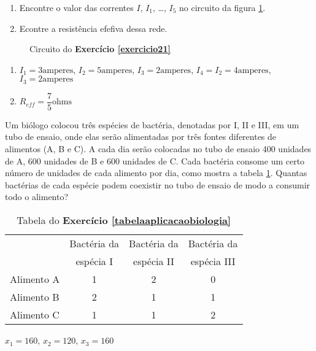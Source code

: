 \documentclass[12pt]{exam}
\begin{document}
\begin{exercicio}\label{exercicio21}
  \begin{enumerate}[label={\alph*})]
    \item Encontre o valor das correntes $I$, $I_1$, \dots, $I_5$ no circuito da figura \ref{exercicio21circuitopoole}.
    \item Econtre a resistência efefiva dessa rede.
  \end{enumerate}
  \begin{figure}
    \centering
    
    \caption{Circuito do \textbf{Exercício \ref{exercicio21}}}
    \label{exercicio21circuitopoole}
  \end{figure}
  \begin{solucao}
    \begin{enumerate}[label={\alph*})]
      \item $I_1 = 3 \mbox{amperes}$, $I_2 = 5 \mbox{amperes}$, $I_3 = 2 \mbox{amperes}$, $I_4 = I_2 =  4\mbox{amperes}$, $I_3 = 2 \mbox{amperes}$
      \item $R_{eff} = \dfrac{7}{5} \mbox{ohms}$
    \end{enumerate}
  \end{solucao}
\end{exercicio}

\begin{exercicio}\label{tabelaaplicacaobiologia}
  Um biólogo colocou três espécies de bactéria, denotadas por I, II e III, em um tubo de ensaio, onde elas serão alimentadas por três fontes diferentes de alimentos (A, B e C). A cada dia serão colocadas no tubo de ensaio 400 unidades de A, 600 unidades de B e 600 unidades de C. Cada bactéria consome um certo número de unidades de cada alimento por dia, como mostra a tabela \ref{tabelabacterias}. Quantas bactérias de cada espécie podem coexistir no tubo de ensaio de modo a consumir todo o alimento?
  \begin{table}[!h]
    \begin{center}
      \begin{tabular}{lccc}
        & Bactéria da & Bactéria da & Bactéria da \\
        & espécia I & espécia II & espécia III\\
        \hline
        Alimento A & 1 & 2 & 0\\
        Alimento B & 2 & 1 & 1\\
        Alimento C & 1 & 1 & 2\\
        \hline
      \end{tabular}
      \caption{Tabela do \textbf{Exercício \ref{tabelaaplicacaobiologia}}}
      \label{tabelabacterias}
    \end{center}
  \end{table}
  \begin{solucao}
    $x_1 = 160$, $x_2 = 120$, $x_3 = 160$
  \end{solucao}
\end{exercicio}
\end{document}
